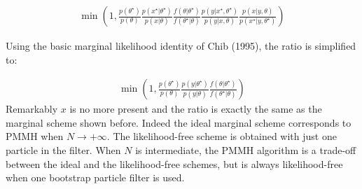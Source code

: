 \documentclass[11pt,a4,twosided,singlespacing,titlepagenumber=on]{scrreprt}
\numberwithin{equation}{chapter} %
\theoremstyle{remark}
\begin{document}
\begin{align*}
 \min \left(1, \frac{p(\theta^\star)}{p(\theta)}   \frac{p({x}^\star|\theta^\star)}{p({x}|\theta)}   \frac{f(\theta|\theta^\star)}{f(\theta^\star|\theta)}   \frac{p(y|{x}^\star,\theta^\star)}{p(y|{x},\theta)}  \frac{p({x}|y,\theta)}{p({x}^\star|y,\theta^\star)} \right)
\end{align*}

Using the basic marginal likelihood identity of Chib (1995), the ratio is simplified to:

\begin{align*}
 \min \left(1, \frac{p(\theta^\star)}{p(\theta)}  \frac{p(y|\theta^\star)}{p(y|\theta)} \frac{f(\theta|\theta^\star)}{f(\theta^\star|\theta)} \right)
\end{align*}
Remarkably $x$ is no more present and the ratio is exactly the same as the marginal scheme shown before. Indeed the ideal marginal scheme corresponds to PMMH when $N \rightarrow +\infty$. The likelihood-free scheme is obtained with just one particle in the filter. When $N$ is intermediate, the PMMH algorithm is a trade-off between the ideal and the likelihood-free schemes, but is always likelihood-free when one bootstrap particle filter is used.

\cleardoublepage
{}
{} %


\appendix %
\end{document}
